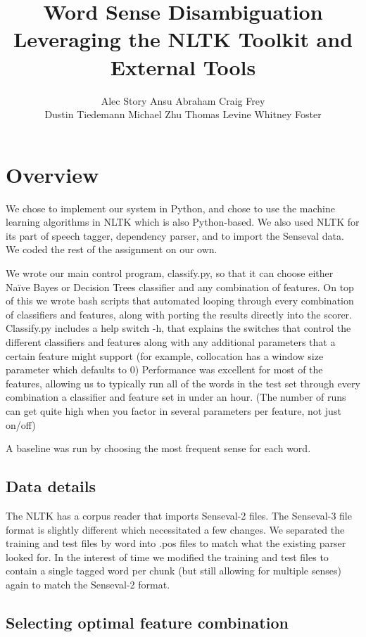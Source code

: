 \documentclass{article}
\title{Word Sense Disambiguation\\
\small{Leveraging the NLTK Toolkit and External Tools}}
\author{
Alec Story
Ansu Abraham
Craig Frey\\
Dustin Tiedemann
Michael Zhu
Thomas Levine
Whitney Foster\\
}
\newcommand{\Naive}{Na\"ive}
\begin{document}
\maketitle

\section{Overview}

We  chose to implement our system in Python, and chose to use the machine
learning algorithms in NLTK which is also Python-based.  We also used NLTK for
its part of speech tagger, dependency parser, and to import the Senseval data.
We coded the rest of the assignment on our own.

We wrote our main control program, classify.py, so that it can choose either
\Naive{} Bayes or Decision Trees classifier and any 
combination of  features. On top of this we wrote bash scripts that automated
looping through every combination of classifiers and features, along with
porting the results directly into the scorer.  Classify.py includes a help
switch -h, that explains the switches that control the different classifiers
and features along with any additional parameters that a certain feature might
support (for example, collocation has a window size parameter which defaults to
0) Performance was excellent for most of the features, allowing us to typically
run all of the words in the test set through every combination a classifier and
feature set in under an hour. (The number of runs can get quite high when you
factor in several parameters per feature, not just on/off)

A baseline was run by choosing the most frequent sense for each word.

\subsection{Data details}

The  NLTK has a corpus reader  that imports Senseval-2 files. The Senseval-3
file format is slightly  different which necessitated a few changes. We
separated the training  and test files by word into .pos files to match  what
the existing  parser looked for. In the interest of time we modified  the
training and  test files to contain a single tagged word per chunk  (but still
allowing for multiple senses) again to match the Senseval-2  format.

\subsection{Selecting optimal feature combination}
\newcommand\ward{forward} %
\end{document}
